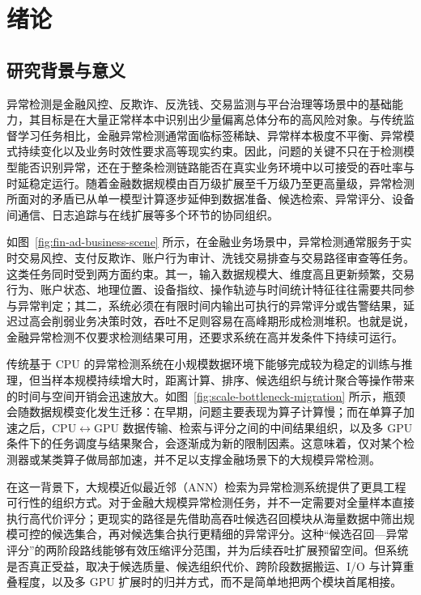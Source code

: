 
\chapter{绪论}

\section{研究背景与意义}

异常检测是金融风控、反欺诈、反洗钱、交易监测与平台治理等场景中的基础能力，其目标是在大量正常样本中识别出少量偏离总体分布的高风险对象。与传统监督学习任务相比，金融异常检测通常面临标签稀缺、异常样本极度不平衡、异常模式持续变化以及业务时效性要求高等现实约束。因此，问题的关键不只在于检测模型能否识别异常，还在于整条检测链路能否在真实业务环境中以可接受的吞吐率与时延稳定运行\citep{aggarwal2017outlier}。随着金融数据规模由百万级扩展至千万级乃至更高量级，异常检测所面对的矛盾已从单一模型计算逐步延伸到数据准备、候选检索、异常评分、设备间通信、日志追踪与在线扩展等多个环节的协同组织。

如图~\ref{fig:fin-ad-business-scene} 所示，在金融业务场景中，异常检测通常服务于实时交易风控、支付反欺诈、账户行为审计、洗钱交易排查与交易路径审查等任务。这类任务同时受到两方面约束。其一，输入数据规模大、维度高且更新频繁，交易行为、账户状态、地理位置、设备指纹、操作轨迹与时间统计特征往往需要共同参与异常判定；其二，系统必须在有限时间内输出可执行的异常评分或告警结果，延迟过高会削弱业务决策时效，吞吐不足则容易在高峰期形成检测堆积\citep{aggarwal2017outlier}。也就是说，金融异常检测不仅要求检测结果可用，还要求系统在高并发条件下持续可运行。

传统基于 CPU 的异常检测系统在小规模数据环境下能够完成较为稳定的训练与推理，但当样本规模持续增大时，距离计算、排序、候选组织与统计聚合等操作带来的时间与空间开销会迅速放大\citep{aggarwal2017outlier}。如图~\ref{fig:scale-bottleneck-migration} 所示，瓶颈会随数据规模变化发生迁移：在早期，问题主要表现为算子计算慢；而在单算子加速之后，CPU$\leftrightarrow$GPU 数据传输、检索与评分之间的中间结果组织，以及多 GPU 条件下的任务调度与结果聚合，会逐渐成为新的限制因素。这意味着，仅对某个检测器或某类算子做局部加速，并不足以支撑金融场景下的大规模异常检测。

在这一背景下，大规模近似最近邻（ANN）检索为异常检测系统提供了更具工程可行性的组织方式。对于金融大规模异常检测任务，并不一定需要对全量样本直接执行高代价评分；更现实的路径是先借助高吞吐候选召回模块从海量数据中筛出规模可控的候选集合，再对候选集合执行更精细的异常评分。这种``候选召回---异常评分''的两阶段路线能够有效压缩评分范围，并为后续吞吐扩展预留空间。但系统是否真正受益，取决于候选质量、候选组织代价、跨阶段数据搬运、I/O 与计算重叠程度，以及多 GPU 扩展时的归并方式，而不是简单地把两个模块首尾相接。

